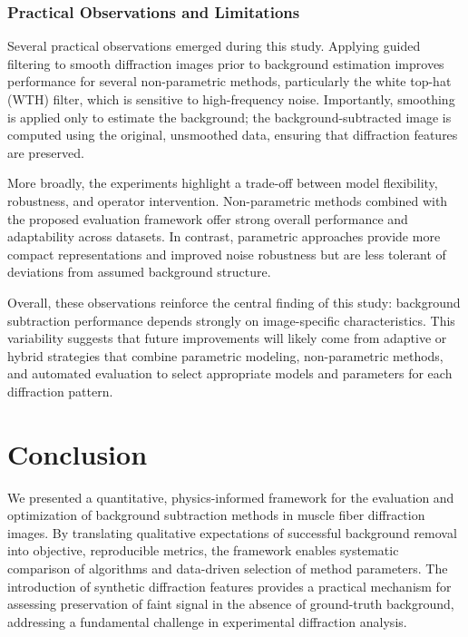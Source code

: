 \documentclass[iucr]{iucrjournals}
\begin{document}
\subsubsection{Practical Observations and Limitations}

Several practical observations emerged during this study. Applying guided filtering to smooth diffraction images prior to background estimation improves performance for several non-parametric methods, particularly the white top-hat (WTH) filter, which is sensitive to high-frequency noise. Importantly, smoothing is applied only to estimate the background; the background-subtracted image is computed using the original, unsmoothed data, ensuring that diffraction features are preserved.

More broadly, the experiments highlight a trade-off between model flexibility, robustness, and operator intervention. Non-parametric methods combined with the proposed evaluation framework offer strong overall performance and adaptability across datasets. In contrast, parametric approaches provide more compact representations and improved noise robustness but are less tolerant of deviations from assumed background structure.

Overall, these observations reinforce the central finding of this study: background subtraction performance depends strongly on image-specific characteristics. This variability suggests that future improvements will likely come from adaptive or hybrid strategies that combine parametric modeling, non-parametric methods, and automated evaluation to select appropriate models and parameters for each diffraction pattern.





\section{Conclusion} 

We presented a quantitative, physics-informed framework for the evaluation and optimization of background subtraction methods in muscle fiber diffraction images. By translating qualitative expectations of successful background removal into objective, reproducible metrics, the framework enables systematic comparison of algorithms and data-driven selection of method parameters. The introduction of synthetic diffraction features provides a practical mechanism for assessing preservation of faint signal in the absence of ground-truth background, addressing a fundamental challenge in experimental diffraction analysis.
\end{document}
